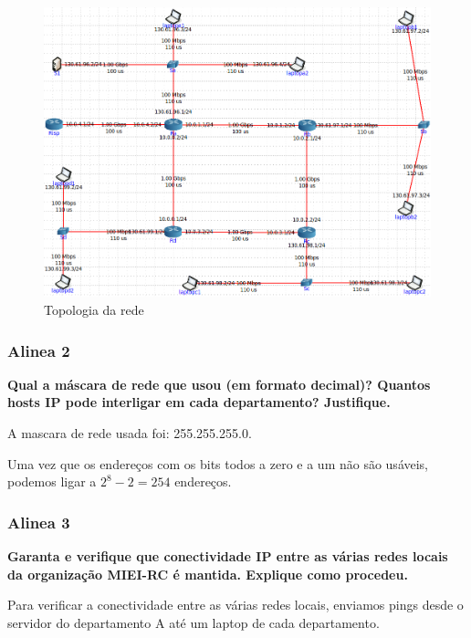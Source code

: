 \documentclass{article}
\begin{document}
\begin{figure}[h]
	\centering
	\includegraphics[scale = 0.4]{rede-tp2-ex3.png}
	\caption{Topologia da rede}
\end{figure}

\subsubsection{Alinea 2}
\textbf{Qual a máscara de rede que usou (em formato decimal)? Quantos hosts IP pode interligar em cada departamento? Justifique.}\\\par
A mascara de rede usada foi: 255.255.255.0.\par
Uma vez que os endereços com os bits todos a zero e a um não são usáveis, podemos ligar a $2^8 - 2 = 254$ endereços.

\subsubsection{Alinea 3}
\textbf{Garanta e verifique que conectividade IP entre as várias redes locais da organização MIEI-RC é mantida. Explique como procedeu.}\\\par
Para verificar a conectividade entre as várias redes locais, enviamos pings desde o servidor do departamento A até um laptop de cada departamento. 
\end{document}
